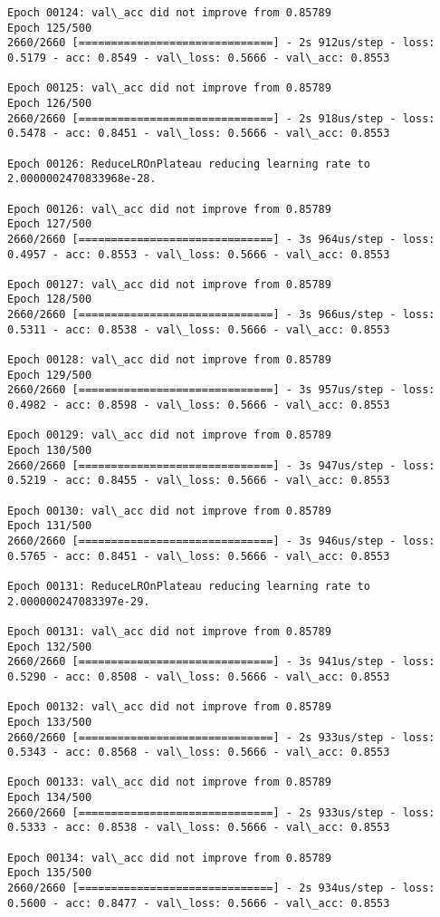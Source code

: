 \documentclass[11pt]{article}
\begin{document}
\begin{Verbatim}[commandchars=\\\{\}]
Epoch 00124: val\_acc did not improve from 0.85789
Epoch 125/500
2660/2660 [==============================] - 2s 912us/step - loss: 0.5179 - acc: 0.8549 - val\_loss: 0.5666 - val\_acc: 0.8553

Epoch 00125: val\_acc did not improve from 0.85789
Epoch 126/500
2660/2660 [==============================] - 2s 918us/step - loss: 0.5478 - acc: 0.8451 - val\_loss: 0.5666 - val\_acc: 0.8553

Epoch 00126: ReduceLROnPlateau reducing learning rate to 2.0000002470833968e-28.

Epoch 00126: val\_acc did not improve from 0.85789
Epoch 127/500
2660/2660 [==============================] - 3s 964us/step - loss: 0.4957 - acc: 0.8553 - val\_loss: 0.5666 - val\_acc: 0.8553

Epoch 00127: val\_acc did not improve from 0.85789
Epoch 128/500
2660/2660 [==============================] - 3s 966us/step - loss: 0.5311 - acc: 0.8538 - val\_loss: 0.5666 - val\_acc: 0.8553

Epoch 00128: val\_acc did not improve from 0.85789
Epoch 129/500
2660/2660 [==============================] - 3s 957us/step - loss: 0.4982 - acc: 0.8598 - val\_loss: 0.5666 - val\_acc: 0.8553

Epoch 00129: val\_acc did not improve from 0.85789
Epoch 130/500
2660/2660 [==============================] - 3s 947us/step - loss: 0.5219 - acc: 0.8455 - val\_loss: 0.5666 - val\_acc: 0.8553

Epoch 00130: val\_acc did not improve from 0.85789
Epoch 131/500
2660/2660 [==============================] - 3s 946us/step - loss: 0.5765 - acc: 0.8451 - val\_loss: 0.5666 - val\_acc: 0.8553

Epoch 00131: ReduceLROnPlateau reducing learning rate to 2.000000247083397e-29.

Epoch 00131: val\_acc did not improve from 0.85789
Epoch 132/500
2660/2660 [==============================] - 3s 941us/step - loss: 0.5290 - acc: 0.8508 - val\_loss: 0.5666 - val\_acc: 0.8553

Epoch 00132: val\_acc did not improve from 0.85789
Epoch 133/500
2660/2660 [==============================] - 2s 933us/step - loss: 0.5343 - acc: 0.8568 - val\_loss: 0.5666 - val\_acc: 0.8553

Epoch 00133: val\_acc did not improve from 0.85789
Epoch 134/500
2660/2660 [==============================] - 2s 933us/step - loss: 0.5333 - acc: 0.8538 - val\_loss: 0.5666 - val\_acc: 0.8553

Epoch 00134: val\_acc did not improve from 0.85789
Epoch 135/500
2660/2660 [==============================] - 2s 934us/step - loss: 0.5600 - acc: 0.8477 - val\_loss: 0.5666 - val\_acc: 0.8553


\end{Verbatim}
\end{document}

